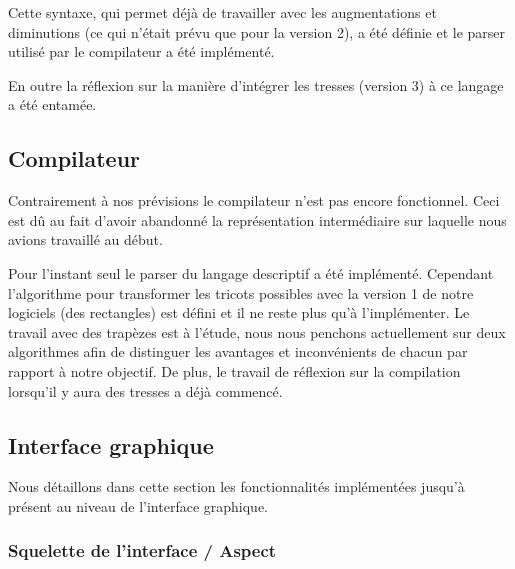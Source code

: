 \documentclass{article}
\begin{document}
Cette syntaxe, qui permet déjà de travailler avec les augmentations et diminutions (ce qui n'était prévu que pour la version 2), a été définie et le parser utilisé par le compilateur a été implémenté.

En outre la réflexion sur la manière d'intégrer les tresses (version 3) à ce langage a été entamée. %


\subsection{Compilateur}


Contrairement à nos prévisions le compilateur n'est pas encore fonctionnel. Ceci est dû au fait d'avoir abandonné la représentation intermédiaire sur laquelle nous avions travaillé au début.

Pour l'instant seul le parser du langage descriptif a été implémenté. Cependant l'algorithme pour transformer les tricots possibles avec la version 1 de notre logiciels (des rectangles) est défini et il ne reste plus qu'à l'implémenter. Le travail avec des trapèzes est à l'étude, nous nous penchons actuellement sur deux algorithmes afin de distinguer les avantages et inconvénients de chacun par rapport à notre objectif. %
De plus, le travail de réflexion sur la compilation lorsqu'il y aura des tresses a déjà commencé.


\subsection{Interface graphique}

Nous détaillons dans cette section les fonctionnalités implémentées jusqu'à présent au niveau de l'interface graphique.

\subsubsection{Squelette de l'interface / Aspect}
\end{document}
